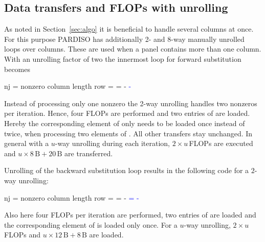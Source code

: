 \subsection{Data transfers and FLOPs with unrolling}
\label{sec:pm:dt:wu}

%
As noted in Section~\ref{sec:algo} it is beneficial to handle several columns
at once.
For this purpose PARDISO has additionally 2- and 8-way manually unrolled
loops over columns.  These are used when a panel contains more than one column.
With an unrolling factor of two the innermost loop for forward substitution becomes
%
\begin{algorithmic}[1]
  \State nj = nonzero column length
      \State row = \nindx[i++]
      \State \nr[row] = \nr[row] - \nr[j] \nlnz[k] \textcolor{blue}{- \nr[j+1] \nlnz[k+nj]}
  \EndFor
\end{algorithmic}%
\noindent%
%
Instead of processing only one nonzero the 2-way unrolling handles two
nonzeros per iteration.
Hence, four FLOPs are performed and two entries of \vlnz{} are loaded.
Hereby the corresponding element of \vr{} only needs to be loaded once instead of
twice, when processing two elements of \vlnz{}.
All other transfers stay unchanged.
%
In general with a $u$-way unrolling during each iteration, $2 \times u$\,FLOPs
are executed and $u \times 8\,\text{B} + 20\,\text{B}$ are transferred.

Unrolling of the backward substitution loop results in the following code for a
$2$-way unrolling:
%
\begin{algorithmic}[1]
  \State nj = nonzero column length
      \State row = \nindx[i++]
      \State \nr[j]   = \nr[j] - \nlnz[k] \nr[row]
      \State \textcolor{blue}{\nr[j+1]   = \nr[j+1] - \nlnz[k+nj] \nr[row]}
  \EndFor
\end{algorithmic}%
\noindent%
%
Also here four FLOPs per iteration are performed, two entries of \vlnz{} are
loaded and the corresponding element of \vr{} is loaded only once.
%
For a $u$-way unrolling, $2 \times u$\,FLOPs and $u \times 12\,\text{B} +
8\,\text{B}$ are loaded.

